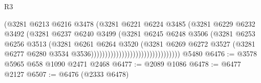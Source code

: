 \begin{lexlean}{R3}
\begin{coremodule}
                                                  (@3281
                                                    @6213
                                                    @6216
                                                    @3478
                                                    (@3281
                                                      @6221
                                                      @6224
                                                      @3485
                                                      (@3281
                                                        @6229
                                                        @6232
                                                        @3492
                                                        (@3281
                                                          @6237
                                                          @6240
                                                          @3499
                                                          (@3281
                                                            @6245
                                                            @6248
                                                            @3506
                                                            (@3281
                                                              @6253
                                                              @6256
                                                              @3513
                                                              (@3281
                                                                @6261
                                                                @6264
                                                                @3520
                                                                (@3281
                                                                  @6269
                                                                  @6272
                                                                  @3527
                                                                  (@3281
                                                                    @6277
                                                                    @6280
                                                                    @3534
                                                                    @3536))))))))))))))))))))))))))))))))
    @5480
@6476 := @3578 @5965 @658 @1090 @2471 @2468
@6477 := @2089 @1086
@6478 := @6477 @2127
@6507 := @6476
    (@2333 @6478)

\end{coremodule}
\end{lexlean}
